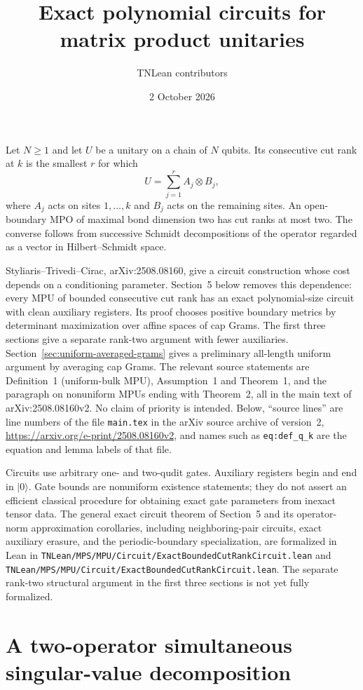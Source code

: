 \documentclass[11pt]{article}
\title{Exact polynomial circuits for matrix product unitaries}
\author{TNLean contributors}
\date{2 October 2026}
\begin{document}
\maketitle

Let $N\geq1$ and let $U$ be a unitary on a chain of $N$ qubits. Its consecutive cut rank
at $k$ is the smallest $r$ for which
\[
 U=\sum_{j=1}^r A_j\otimes B_j,
\]
where $A_j$ acts on sites $1,\ldots,k$ and $B_j$ acts on the remaining
sites. An open-boundary MPO of maximal bond dimension two has cut ranks
at most two. The converse follows from successive Schmidt decompositions
of the operator regarded as a vector in Hilbert--Schmidt space.

Styliaris--Trivedi--Cirac, arXiv:2508.08160, give a circuit construction
whose cost depends on a conditioning parameter. Section~5 below removes
this dependence: every MPU of bounded consecutive cut rank has an exact
polynomial-size circuit with clean auxiliary registers. Its proof chooses
positive boundary metrics by determinant maximization over affine spaces
of cap Grams. The first three sections give a separate rank-two argument
with fewer auxiliaries. Section~\ref{sec:uniform-averaged-grams} gives a
preliminary all-length uniform argument by averaging cap Grams.
The relevant source statements are Definition~1 (uniform-bulk MPU),
Assumption~1 and Theorem~1, and the paragraph on nonuniform MPUs ending
with Theorem~2, all in the main text of arXiv:2508.08160v2.
No claim of priority is intended.
Below, ``source lines'' are line numbers of the file \texttt{main.tex} in
the arXiv source archive of version~2,
\url{https://arxiv.org/e-print/2508.08160v2}, and names such as
\nolinkurl{eq:def_q_k} are the equation and lemma labels of that file.

Circuits use arbitrary one- and two-qudit gates. Auxiliary registers begin
and end in $|0\rangle$. Gate bounds are nonuniform existence statements;
they do not assert an efficient classical procedure for obtaining exact
gate parameters from inexact tensor data. The general exact circuit
theorem of Section~5 and its operator-norm approximation corollaries,
including neighboring-pair circuits, exact auxiliary erasure, and the
periodic-boundary specialization, are formalized in Lean in
\nolinkurl{TNLean/MPS/MPU/Circuit/ExactBoundedCutRankCircuit.lean} and
\nolinkurl{TNLean/MPS/MPU/Circuit/ExactBoundedCutRankCircuit.lean}. The separate rank-two structural argument in the
first three sections is not yet fully formalized.

\section{A two-operator simultaneous singular-value decomposition}
\end{document}
